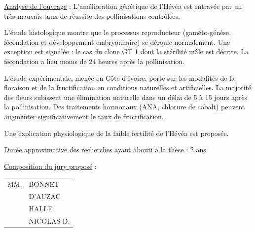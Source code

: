 \uline{Analyse de l'ouvrage} : L'amélioration génétique de l'Hévéa est entravée par un
très mauvais taux de réussite des pollinisations contrôlées.

L'étude histologique montre que le processus reproducteur
(gaméto-génèse, fécondation et développement embryonnaire) se déroule normalement.
Une exception est signalée : le cas du clone GT 1 dont la stérilité mâle est
décrite. La fécondation a lieu moins de 24 heures après la pollinisation.

L'étude expérimentale, menée en Côte d'Ivoire, porte sur
les modalités de la floraison et de la fructification en conditions naturelles
et artificielles. La majorité des fleurs subissent une élimination naturelle
dans un délai de 5 à 15 jours après la pollinisation. Des traitements hormonaux
(ANA, chlorure de cobalt) peuvent augmenter significativement le taux de
fructification.

Une explication physiologique de la faible fertilité
de l'Hévéa est proposée.

\uline{Durée approximative des recherches ayant abouti à la thèse} : 2 ans

\uline{Composition du jury proposé} : \begin{tabular}[t]{ll}
MM. & BONNET\\
& D'AUZAC\\
& HALLE\\
& NICOLAS D.
\end{tabular}

